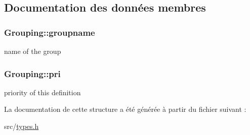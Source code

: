 \subsection{Documentation des données membres}
\hypertarget{struct_grouping_a05e6a053a86cc2f588d065f3880801dc}{}
\subsubsection[{groupname}]{ Grouping\+::groupname}\label{struct_grouping_a05e6a053a86cc2f588d065f3880801dc}


name of the group 

\hypertarget{struct_grouping_aead55d7198ceffe16cb82d2c114e4254}{}
\subsubsection[{pri}]{ Grouping\+::pri}\label{struct_grouping_aead55d7198ceffe16cb82d2c114e4254}


priority of this definition 



La documentation de cette structure a été générée à partir du fichier suivant \+:\begin{DoxyCompactItemize}
\item 
src/\hyperlink{types_8h}{types.\+h}\end{DoxyCompactItemize}
